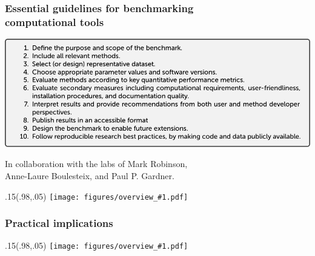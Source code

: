 \documentclass[usepdftitle=false, compress]{beamer}
\newcommand{\topright}[1]{%
\begin{textblock*}{.15\linewidth}(.98\linewidth,.05\linewidth)
	\texttt{[image: figures/overview\_\#1.pdf]}
\end{textblock*}}
\begin{document}

\begin{frame}
	\frametitle{Essential guidelines for benchmarking\\computational tools}
	\begin{center}
		\includegraphics[width=\linewidth]{figures/end_part_guidelines.pdf}
	\end{center}
	{\scriptsize 
	\begin{flushright}
		In collaboration with the labs of Mark Robinson,\\Anne-Laure Boulesteix, and Paul P. Gardner.
	\end{flushright}}
	\topright{ch9}
\end{frame}



\begin{frame}
	\frametitle{Practical implications}
  \topright{all}
\end{frame}
\end{document}
